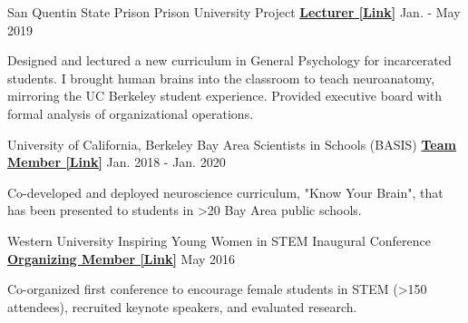 \begin{cventries}
\begin{cventries}
\end{cventries}
    

\begin{cventries}

  \cventry
    {San Quentin State Prison} %
    {Prison University Project}
    {\href{https://www.neh.gov/about/awards/national-humanities-medals/prison-university-project}{\textbf{Lecturer [Link]}}} %
    {Jan. - May 2019} %
    {
      \begin{cvitems} %
        \item {Designed and lectured a new curriculum in General Psychology for incarcerated students. I brought human brains into the classroom to teach neuroanatomy, mirroring the UC Berkeley student experience. Provided executive board with formal analysis of organizational operations.}
      \end{cvitems}
    }

  \cventry
  	{University of California, Berkeley} %
  	{Bay Area Scientists in Schools (BASIS)}
    {\href{https://docs.google.com/document/d/1EgLHC_wA5ZApCDpqfWc4APGsVKdoymPw/edit?usp=sharing&ouid=110847987931723045299&rtpof=true&sd=true}{\textbf{Team Member [Link]}}} %
    {Jan. 2018 - Jan. 2020} %
    {
      \begin{cvitems} %
        \item {Co-developed and deployed neuroscience curriculum, "Know Your Brain", that has been presented to students in >20 Bay Area public schools.}
      \end{cvitems}
    }
    
  \cventry
    {Western University} %
    {Inspiring Young Women in STEM Inaugural Conference}
    {\href{https://www.inspiringdiversityinstem.com/2016-conference}{\textbf{Organizing Member [Link]}}} %
    {May 2016} %
    {
      \begin{cvitems} %
        \item {Co-organized first conference to encourage female students in STEM (>150 attendees), recruited keynote speakers, and evaluated research.}
      \end{cvitems}
    }
    

\end{cventries}
\end{cventries}
